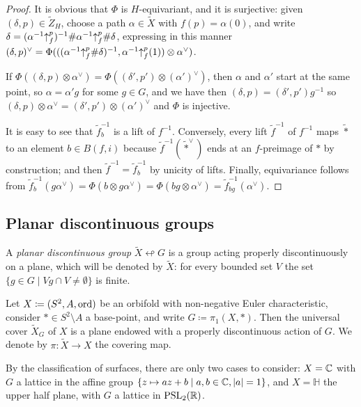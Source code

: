 \documentclass{amsart}
\newcommand\wtf{{\widetilde f}}
\begin{document}
\begin{proof}
  It is obvious that $\Phi$ is $H$-equivariant, and it is surjective:
  given $(\delta,p)\in\widetilde Z_H$, choose a path
  $\alpha\in\widetilde X$ with $f(p)=\alpha(0)$, and write
  $\delta=(\alpha^{-1}{\uparrow}_{f}^{p})^{-1}\#\alpha^{-1}{\uparrow}_{f}^{p}\#\delta$,
  expressing in this manner
  $(\delta,p)^\vee=\Phi(((\alpha^{-1}{\uparrow}_{f}^{p}\#\delta)^{-1},\alpha^{-1}{\uparrow}_{f}^{p}(1))\otimes\alpha^\vee)$.

  If
  $\Phi((\delta,p)\otimes\alpha^\vee)=\Phi((\delta',p')\otimes(\alpha')^\vee)$,
  then $\alpha$ and $\alpha'$ start at the same point, so
  $\alpha=\alpha' g$ for some $g\in G$, and we have then
  $(\delta,p)=(\delta',p')g^{-1}$ so
  $(\delta,p)\otimes\alpha^\vee=(\delta',p')\otimes(\alpha')^\vee$
  and $\Phi$ is injective.

  It is easy to see that $\wtf^{-1}_b$ is a lift of
  $f^{-1}$. Conversely, every lift $\wtf^{-1}$ of $f^{-1}$
  maps $\widetilde *$ to an element $b\in B(f,i)$ because
  $\wtf^{-1}(\widetilde *^\vee)$ ends at an $f$-preimage of
  $*$ by construction; and then
  $\wtf^{-1}=\wtf^{-1}_b$ by unicity of
  lifts. Finally, equivariance follows from
  $\wtf^{-1}_b(g \alpha^\vee)=\Phi(b\otimes
  g\alpha^\vee)=\Phi(b g\otimes\alpha^\vee)=\wtf^{-1}_{b
    g}(\alpha^\vee)$.
\end{proof}

\subsection{Planar discontinuous groups}\label{ss:PlanDiscGroups}
A \emph{planar discontinuous group} $\widetilde X\looparrowleft G$ is
a group acting properly discontinuously on a plane, which will be
denoted by $\widetilde X$: for every bounded set $V$ the set
$\{g\in G\mid V g\cap V\neq\emptyset\}$ is finite.

Let $X\coloneqq(S^2,A,\operatorname{ord})$ be an orbifold with non-negative Euler
characteristic, consider $*\in S^2\setminus A$ a base-point, and write
$G\coloneqq\pi_1(X,*)$. Then the universal cover $\widetilde X_G$ of
$X$ is a plane endowed with a properly discontinuous action of $G$. We
denote by $\pi\colon\widetilde X\to X$ the covering map.

By the classification of surfaces, there are only two cases to
consider: $X={\mathbb C}$ with $G$ a lattice in the affine group
$\{z\mapsto a z+b\mid a,b\in{\mathbb C},|a|=1\}$, and $X=\mathbb H$ the upper
half plane, with $G$ a lattice in $\operatorname{PSL}_2({\mathbb R})$.
\end{document}
